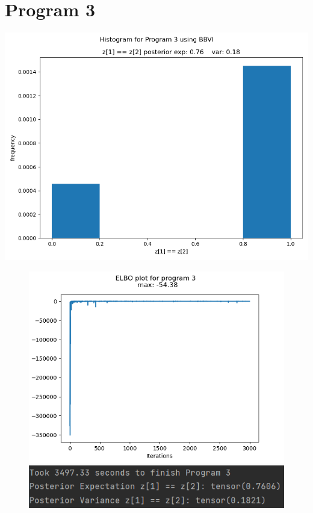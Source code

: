 \documentclass[10pt]{homeworg}
\begin{document}

\section{Program 3}
\begin{center}
\includegraphics[scale=0.5]{figures/BBVI_program_3.png}
\end{center}

\begin{figure}[!htbp]
    \centering
    \begin{minipage}{0.45\textwidth}
        \centering
       \includegraphics[scale=0.5]{figures/elbo_program_3.png}
    \end{minipage}\hfill
    \begin{minipage}{0.45\textwidth}
        \centering
        \includegraphics[scale=0.8]{figures/program3_time.png}
    \end{minipage}
\end{figure}
\end{document}
